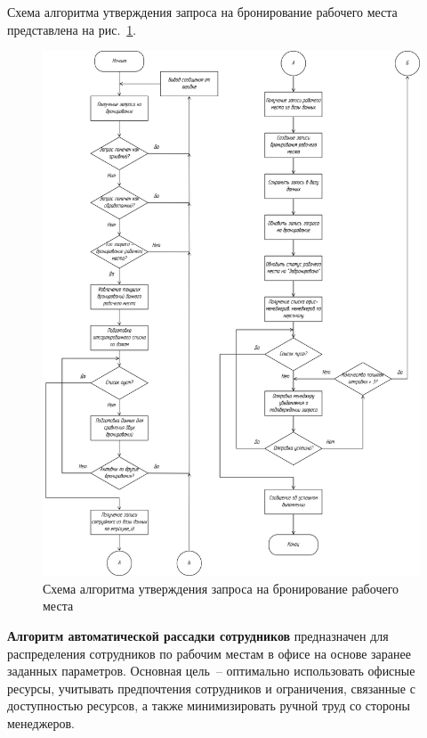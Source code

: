 Схема алгоритма утверждения запроса на бронирование рабочего места представлена на рис.~\ref{fig:system-design:algorithms:approve-workspace-request}.

\begin{figure}
\centering
    \includegraphics[width=0.99\linewidth]{assets/algorithm-approve-request.png}
    \caption{Схема алгоритма утверждения запроса на бронирование рабочего места}
    \label{fig:system-design:algorithms:approve-workspace-request}
\end{figure}

\textbf{Алгоритм автоматической рассадки сотрудников} предназначен для распределения сотрудников по рабочим местам в офисе на основе заранее заданных параметров. Основная цель~-- оптимально использовать офисные ресурсы, учитывать предпочтения сотрудников и ограничения, связанные с доступностью ресурсов, а также минимизировать ручной труд со стороны менеджеров.

